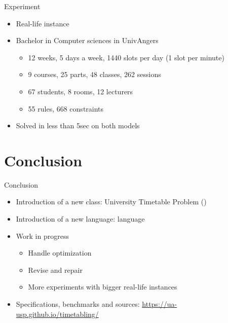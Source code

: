 \documentclass{beamer}
\begin{document}
\begin{frame}{Experiment}
    \begin{itemize}
        \item Real-life instance
        \item Bachelor in Computer sciences in UnivAngers
        \begin{itemize}
            \item 12 weeks, 5 days a week, 1440 slots per day (1 slot per minute)
            \item 9 courses, 25 parts, 48 classes, 262 sessions
            \item 67 students, 8 rooms, 12 lecturers
            \item 55 rules, 668 constraints
        \end{itemize}
        \item Solved in less than 5sec on both models
    \end{itemize}
\end{frame}

\section{Conclusion}

\begin{frame}{Conclusion}
    \begin{itemize}
        \item Introduction of a new class: University Timetable Problem (\UTP{})
        \item Introduction of a new language: \UTP{} language
        \item Work in progress
        \begin{itemize}
            \item Handle optimization
            \item Revise and repair
            \item More experiments with bigger real-life instances
        \end{itemize}
        \item Specifications, benchmarks and sources: \url{https://ua-usp.github.io/timetabling/}
    \end{itemize}
\end{frame}

\begin{frame}
\titlepage
\end{frame}
\end{document}
